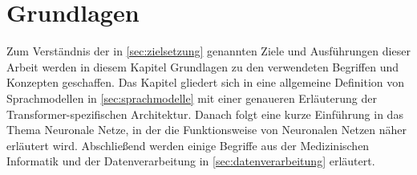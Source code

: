 \chapter{Grundlagen}\label{ch:preliminaries}








Zum Verständnis der in \cref{sec:zielsetzung} genannten Ziele und Ausführungen dieser Arbeit werden in diesem Kapitel Grundlagen zu den verwendeten Begriffen und Konzepten geschaffen.
Das Kapitel gliedert sich in eine allgemeine Definition von Sprachmodellen in \cref{sec:sprachmodelle} mit einer genaueren Erläuterung der Transformer-spezifischen Architektur.
Danach folgt eine kurze Einführung in das Thema Neuronale Netze, in der die Funktionsweise von Neuronalen Netzen näher erläutert wird.
Abschließend werden einige Begriffe aus der Medizinischen Informatik und der Datenverarbeitung in \cref{sec:datenverarbeitung} erläutert.

